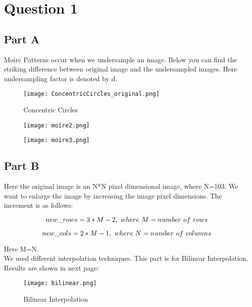 \documentclass[12pt, a4paper]{article}
\begin{document}
\vspace*{-22pt}
\section*{Question 1}
\subsection*{Part A}
Moire Patterns occur when we undersample an image. Below you can find the striking difference between original image and the undersampled images. Here undersampling factor is denoted by d.

\begin{figure}[h!]
  \centering
    \texttt{[image: ConcentricCircles\_original.png]}
    \caption{Concentric Circles}
  \label{fig:1}
\end{figure}

\begin{figure}[h!]
  \centering
    \texttt{[image: moire2.png]}
    \caption{}
  \label{fig:1}
\end{figure}

\begin{figure}[h!]
  \centering
    \texttt{[image: moire3.png]}
    \caption{}
  \label{fig:1}
\end{figure}

\subsection*{Part B}
Here the original image is an N*N pixel dimensional image, where N=103. We want to enlarge the image by increasing the image pixel dimensions. The increment is as follows:

\begin{equation*}
    new\_rows=3*M-2,\ where\ M=number\ of\ rows\\
\end{equation*}

\begin{equation*}
    new\_cols=2*M-1,\ where\ N=number\ of\ columns\\
\end{equation*}

Here M=N.\\
We used different interpolation techniques. This part is for Bilinear Interpolation. Results are shown in next page:

\begin{figure}[h!]
  \centering
    \texttt{[image: bilinear.png]}
    \caption{Bilinear Interpolation}
  \label{fig:3}
\end{figure}
\end{document}
